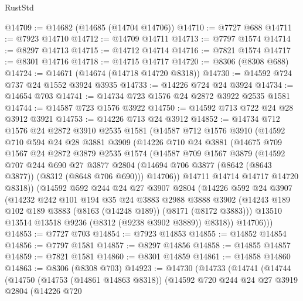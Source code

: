 \begin{lexlean}{RustStd}
\begin{coremodule}
@14709 := @14682 (@14685 (@14704 @14706))
@14710 := @7727 @688
@14711 := @7923 @14710
@14712 := @14709 @14711
@14713 := @7797 @1574
@14714 := @8297 @14713
@14715 := @14712 @14714
@14716 := @7821 @1574
@14717 := @8301 @14716
@14718 := @14715 @14717
@14720 := @8306 (@8308 @688)
@14724 := @14671 (@14674 (@14718 @14720 @8318))
@14730 := @14592 @724 @737 @24 @1552 @3924 @3935
@14733 := @14226 @724 @24 @3924
@14734 := @14654 @703
@14741 := @14734 @723 @1576 @24 @2872 @3922 @2535 @1581
@14744 := @14587 @723 @1576 @3922
@14750 := @14592 @713 @722 @24 @28 @3912 @3921
@14753 := @14226 @713 @24 @3912
@14852 := @14734
    @712
    @1576
    @24
    @2872
    @3910
    @2535
    @1581
    (@14587
      @712
      @1576
      @3910
      (@14592
        @710
        @594
        @24
        @28
        @3881
        @3909
        (@14226
          @710
          @24
          @3881
          (@14675
            @709
            @1567
            @24
            @2872
            @3879
            @2535
            @1574
            (@14587
              @709
              @1567
              @3879
              (@14592
                @707
                @244
                @690
                @27
                @3877
                @2804
                (@14694 @706 @3877 (@8642 (@8643 @3877)) (@8312 (@8648 @706 @690)))
                @14706))
            @14711
            @14714
            @14717
            @14720
            @8318))
        (@14592
          @592
          @244
          @24
          @27
          @3907
          @2804
          (@14226
            @592
            @24
            @3907
            (@14232
              @242
              @101
              @194
              @35
              @24
              @3883
              @2988
              @3888
              @3902
              (@14243 @189 @102 @189 @3883 (@8163 (@14248 @189)) (@8171 (@8172 @3883)))
              @13510
              @13514
              @13518
              @9236
              (@8312 (@9238 @3902 @3889))
              @8318))
          @14706)))
@14853 := @7727 @703
@14854 := @7923 @14853
@14855 := @14852 @14854
@14856 := @7797 @1581
@14857 := @8297 @14856
@14858 := @14855 @14857
@14859 := @7821 @1581
@14860 := @8301 @14859
@14861 := @14858 @14860
@14863 := @8306 (@8308 @703)
@14923 := @14730
    (@14733
      (@14741
        (@14744
          (@14750
            (@14753 (@14861 @14863 @8318))
            (@14592
              @720
              @244
              @24
              @27
              @3919
              @2804
              (@14226
                @720

\end{coremodule}
\end{lexlean}
